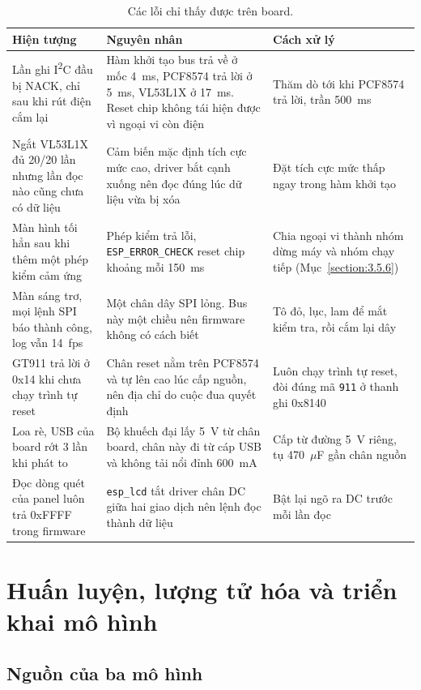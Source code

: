 \documentclass[../DoAn.tex]{subfiles}
\begin{document}
\begin{table}[!htb]
\centering
\small
\caption{Các lỗi chỉ thấy được trên board.}
\label{tab:loi_board}
\begin{tabular}{|L{4.3cm}|L{5.0cm}|L{4.2cm}|}
\hline
\textbf{Hiện tượng} & \textbf{Nguyên nhân} & \textbf{Cách xử lý} \\
\hline
Lần ghi I\textsuperscript{2}C đầu bị NACK, chỉ sau khi rút điện cắm lại & Hàm khởi tạo bus trả về ở mốc 4~ms, PCF8574 trả lời ở 5~ms, VL53L1X ở 17~ms. Reset chip không tái hiện được vì ngoại vi còn điện & Thăm dò tới khi PCF8574 trả lời, trần 500~ms \\
\hline
Ngắt VL53L1X đủ 20/20 lần nhưng lần đọc nào cũng chưa có dữ liệu & Cảm biến mặc định tích cực mức cao, driver bắt cạnh xuống nên đọc đúng lúc dữ liệu vừa bị xóa & Đặt tích cực mức thấp ngay trong hàm khởi tạo \\
\hline
Màn hình tối hẳn sau khi thêm một phép kiểm cảm ứng & Phép kiểm trả lỗi, \texttt{ESP\_ERROR\_CHECK} reset chip khoảng mỗi 150~ms & Chia ngoại vi thành nhóm dừng máy và nhóm chạy tiếp (Mục~\ref{section:3.5.6}) \\
\hline
Màn sáng trơ, mọi lệnh SPI báo thành công, log vẫn 14~fps & Một chân dây SPI lỏng. Bus này một chiều nên firmware không có cách biết & Tô đỏ, lục, lam để mắt kiểm tra, rồi cắm lại dây \\
\hline
GT911 trả lời ở 0x14 khi chưa chạy trình tự reset & Chân reset nằm trên PCF8574 và tự lên cao lúc cấp nguồn, nên địa chỉ do cuộc đua quyết định & Luôn chạy trình tự reset, đòi đúng mã \texttt{911} ở thanh ghi 0x8140 \\
\hline
Loa rè, USB của board rớt 3 lần khi phát to & Bộ khuếch đại lấy 5~V từ chân board, chân này đi từ cáp USB và không tải nổi đỉnh 600~mA & Cấp từ đường 5~V riêng, tụ 470~$\mu$F gần chân nguồn \\
\hline
Đọc dòng quét của panel luôn trả 0xFFFF trong firmware & \texttt{esp\_lcd} tắt driver chân DC giữa hai giao dịch nên lệnh đọc thành dữ liệu & Bật lại ngõ ra DC trước mỗi lần đọc \\
\hline
\end{tabular}
\end{table}

\section{Huấn luyện, lượng tử hóa và triển khai mô hình}
\label{section:4.3}

\subsection{Nguồn của ba mô hình}
\label{section:4.3.1}
\end{document}
